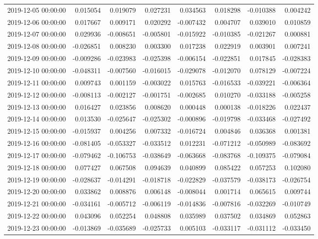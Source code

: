 \begin{tabular}{lrrrrrrr}
2019-12-05 00:00:00 & 0.015054 & 0.019079 & 0.027231 & 0.034563 & 0.018298 & -0.010388 & 0.004242 \\
2019-12-06 00:00:00 & 0.017667 & 0.009171 & 0.020292 & -0.007432 & 0.004707 & 0.039010 & 0.010859 \\
2019-12-07 00:00:00 & 0.029936 & -0.008651 & -0.005801 & -0.015922 & -0.010385 & -0.021267 & 0.000881 \\
2019-12-08 00:00:00 & -0.026851 & 0.008230 & 0.003300 & 0.017238 & 0.022919 & 0.003901 & 0.007241 \\
2019-12-09 00:00:00 & -0.009286 & -0.023983 & -0.025398 & -0.006154 & -0.022851 & 0.017845 & -0.028383 \\
2019-12-10 00:00:00 & -0.048311 & -0.007560 & -0.016015 & -0.029078 & -0.012070 & 0.078129 & -0.007224 \\
2019-12-11 00:00:00 & 0.009743 & 0.001159 & -0.003022 & 0.015763 & -0.016533 & -0.039221 & -0.006364 \\
2019-12-12 00:00:00 & -0.008113 & -0.002127 & -0.001751 & -0.002685 & 0.010270 & -0.033188 & -0.005258 \\
2019-12-13 00:00:00 & 0.016427 & 0.023856 & 0.008620 & 0.000448 & 0.000138 & -0.018226 & 0.022437 \\
2019-12-14 00:00:00 & 0.013530 & -0.025647 & -0.025302 & -0.000896 & -0.019798 & -0.033468 & -0.027492 \\
2019-12-15 00:00:00 & -0.015937 & 0.004256 & 0.007332 & -0.016724 & 0.004846 & 0.036368 & 0.001381 \\
2019-12-16 00:00:00 & -0.081405 & -0.053327 & -0.033512 & 0.012231 & -0.071212 & -0.050989 & -0.083692 \\
2019-12-17 00:00:00 & -0.079462 & -0.106753 & -0.038649 & -0.063668 & -0.083768 & -0.109375 & -0.079084 \\
2019-12-18 00:00:00 & 0.077427 & 0.067508 & 0.094639 & 0.040899 & 0.085422 & 0.057253 & 0.102080 \\
2019-12-19 00:00:00 & -0.028637 & -0.014291 & -0.018718 & -0.022829 & -0.037579 & -0.038173 & -0.026754 \\
2019-12-20 00:00:00 & 0.033862 & 0.008876 & 0.006148 & -0.008044 & 0.001714 & 0.065615 & 0.009744 \\
2019-12-21 00:00:00 & -0.034161 & -0.005712 & -0.006119 & -0.014836 & -0.007816 & -0.032269 & -0.010749 \\
2019-12-22 00:00:00 & 0.043096 & 0.052254 & 0.048808 & 0.035989 & 0.037502 & 0.034869 & 0.052863 \\
2019-12-23 00:00:00 & -0.013869 & -0.035689 & -0.025733 & 0.005103 & -0.033117 & -0.031112 & -0.033450 \\

\end{tabular}
